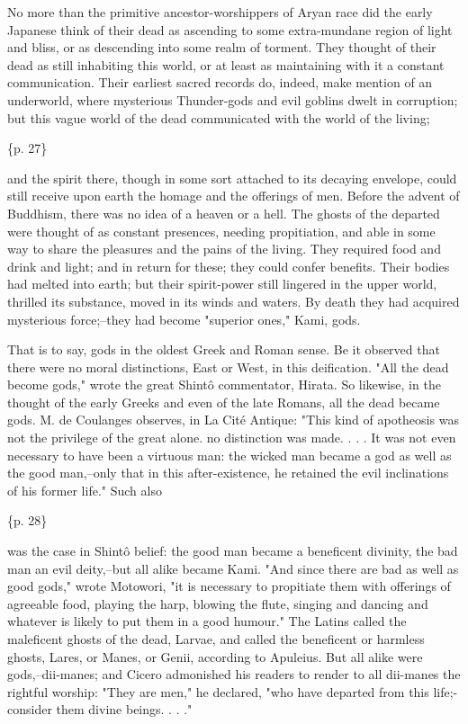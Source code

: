 No more than the primitive ancestor-worshippers of Aryan race did the early Japanese think of their dead as ascending to some extra-mundane region of light and bliss, or as descending into some realm of torment. They thought of their dead as still inhabiting this world, or at least as maintaining with it a constant communication. Their earliest sacred records do, indeed, make mention of an underworld, where mysterious Thunder-gods and evil goblins dwelt in corruption; but this vague world of the dead communicated with the world of the living;

\{p. 27\}

and the spirit there, though in some sort attached to its decaying envelope, could still receive upon earth the homage and the offerings of men. Before the advent of Buddhism, there was no idea of a heaven or a hell. The ghosts of the departed were thought of as constant presences, needing propitiation, and able in some way to share the pleasures and the pains of the living. They required food and drink and light; and in return for these; they could confer benefits. Their bodies had melted into earth; but their spirit-power still lingered in the upper world, thrilled its substance, moved in its winds and waters. By death they had acquired mysterious force;--they had become "superior ones," Kami, gods.

That is to say, gods in the oldest Greek and Roman sense. Be it observed that there were no moral distinctions, East or West, in this deification. "All the dead become gods," wrote the great Shintô commentator, Hirata. So likewise, in the thought of the early Greeks and even of the late Romans, all the dead became gods. M. de Coulanges observes, in La Cité Antique: "This kind of apotheosis was not the privilege of the great alone. no distinction was made. . . . It was not even necessary to have been a virtuous man: the wicked man became a god as well as the good man,--only that in this after-existence, he retained the evil inclinations of his former life." Such also

\{p. 28\}

was the case in Shintô belief: the good man became a beneficent divinity, the bad man an evil deity,--but all alike became Kami. "And since there are bad as well as good gods," wrote Motowori, "it is necessary to propitiate them with offerings of agreeable food, playing the harp, blowing the flute, singing and dancing and whatever is likely to put them in a good humour." The Latins called the maleficent ghosts of the dead, Larvae, and called the beneficent or harmless ghosts, Lares, or Manes, or Genii, according to Apuleius. But all alike were gods,--dii-manes; and Cicero admonished his readers to render to all dii-manes the rightful worship: "They are men," he declared, "who have departed from this life;-consider them divine beings. . . ."

